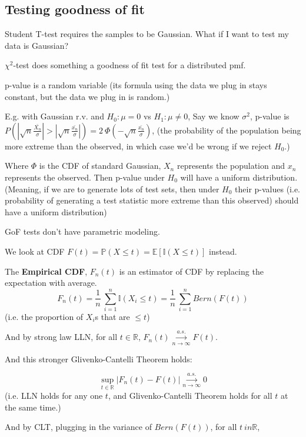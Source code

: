 \documentclass{article}
\begin{document}
\subsection{Testing goodness of fit}

Student T-test requires the samples to be Gaussian.
What if I want to test my data is Gaussian?

$\chi^2$-test does something a goodness of fit test for a distributed pmf.

p-value is a random variable (its formula using the data we plug in stays constant, but the data we plug in is random.)

E.g. with Gaussian r.v. and $H_0: \mu = 0$ vs $H_1: \mu \neq 0$,
Say we know $\sigma^2$, p-value is $P(|\sqrt{n} \frac{\bar{X_n}}{\sigma}| > |\sqrt{n} \frac{\bar{x_n}}{\sigma}|) = 2 ~ \Phi(-\sqrt{n} \frac{\bar{x_n}}{\sigma})$,
(the probability of the population being more extreme than the observed, in which case we'd be wrong if we reject $H_0$.)

Where $\Phi$ is the CDF of standard Gaussian, $X_n$ represents the population and $x_n$ represents the observed.
Then p-value under $H_0$ will have a uniform distribution.
(Meaning, if we are to generate lots of test sets, then under $H_0$ their p-values (i.e. probability of generating a test statistic more extreme than this observed) should have a uniform distribution)

GoF tests don't have parametric modeling.

We look at CDF $F(t) = \mathbb{P}(X \leq t) = \mathbb{E}[\mathbb{I}(X \leq t)]$ instead.


The \textbf{Empirical CDF}, $F_n(t)$ is an estimator of CDF by replacing the expectation with average.
$$
F_n(t) = \frac{1}{n} ~ \sum_{i = 1}^{n}{\mathbb{I}(X_i \leq t)} = \frac{1}{n} ~ \sum_{i = 1}^{n}{Bern(F(t))}
$$
(i.e. the proportion of $X_i$s that are $\leq t$)

And by strong law LLN, for all $t \in \mathbb{R}$, $F_n(t) \overset{a.s.}{\underset{n \to \infty}{\longrightarrow}} F(t)$.

And this stronger Glivenko-Cantelli Theorem holds:

$$
\sup_{t \in \mathbb{R}}|F_n(t) - F(t)| \overset{a.s.}{\underset{n \to \infty}{\longrightarrow}} 0
$$
(i.e. LLN holds for any one $t$, and Glivenko-Cantelli Theorem holds for all $t$ at the same time.)

And by CLT, plugging in the variance of $Bern(F(t))$, for all $t \ in \mathbb{R}$,
\end{document}
